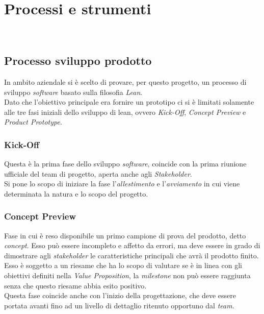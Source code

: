
\chapter{Processi e strumenti}
\label{cap:processi-metodologie}

\\

\section{Processo sviluppo prodotto}
In ambito aziendale si è scelto di provare, per questo progetto, un processo di sviluppo \emph{software} basato sulla filosofia \emph{Lean}.\\
Dato che l'obiettivo principale era fornire un prototipo ci si è limitati solamente alle tre fasi iniziali dello sviluppo di lean, ovvero \emph{Kick-Off}, \emph{Concept Preview} e \emph{Product Prototype}.


\subsection{Kick-Off}
Questa è la prima fase dello sviluppo \emph{software}, coincide con la prima riunione ufficiale del team di progetto, aperta anche agli \emph{Stakeholder}.\\
Si pone lo scopo di iniziare la fase l'\emph{allestimento} e l'\emph{avviamento} in cui viene determinata la natura e lo scopo del progetto.\\

\subsection{Concept Preview}
Fase in cui è reso disponibile un primo campione di prova del prodotto, detto \emph{concept}. Esso può essere incompleto e affetto da errori, ma deve essere in grado di dimostrare agli \emph{stakeholder} le caratteristiche principali che avrà il prodotto finito.\\
Esso è soggetto a un riesame che ha lo scopo di valutare se è in linea con gli obiettivi definiti nella \emph{Value Proposition}, la \emph{milestone} non può essere raggiunta senza che questo riesame abbia esito positivo.\\
Questa fase coincide anche con l'inizio della progettazione, che deve essere portata avanti fino ad un livello di dettaglio ritenuto opportuno dal \emph{team}.\\

